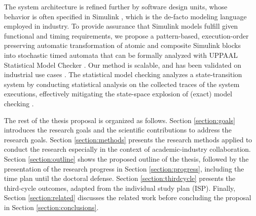 The system architecture is refined further by software design units, whose behavior is often specified in Simulink \cite{JamesB.Dabney2003MasteringSimulink}, which is the de-facto modeling language employed in industry.  To provide assurance that Simulink models fulfill given functional and timing requirements, we propose a pattern-based, execution-order preserving automatic transformation of atomic and composite Simulink blocks into stochastic timed automata that can be formally analyzed with UPPAAL Statistical Model Checker \cite{Bulychev2012UPPAAL-SMC:Automata}. Our method is scalable, and has been validated on industrial use cases \cite{Filipovikj2016SimulinkSystems}. The statistical model checking analyzes a state-transition system by conducting statistical analysis on the collected traces of the system executions, effectively mitigating the state-space explosion of (exact) model checking \cite{Legay2010StatisticalOverview}. 

The rest of the thesis proposal is organized as follows. Section \ref{section:goals} introduces the research goals and the scientific contributions to address the research goals. Section \ref{section:methods} presents the research methods applied to conduct the research especially in the context of academic-industry collaboration. Section \ref{section:outline} shows the proposed outline of the thesis, followed by the presentation of the research progress in Section \ref{section:progress}, including the time plan until the doctoral defense. Section \ref{section:thirdcycle} presents the third-cycle outcomes, adapted from the individual study plan (ISP). Finally, Section \ref{section:related} discusses the related work before concluding the proposal in Section \ref{section:conclusions}.